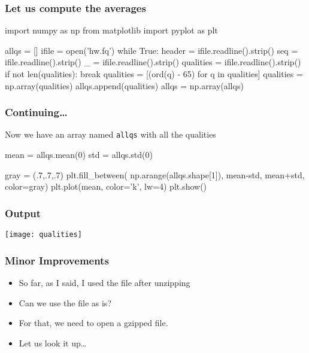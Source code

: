 \begin{frame}[fragile]
\frametitle{Let us compute the averages}

\begin{python}
import numpy as np
from matplotlib import pyplot as plt

allqs = []
ifile = open('hw.fq')
while True:
    header = ifile.readline().strip()
    seq = ifile.readline().strip()
    _ = ifile.readline().strip()
    qualities = ifile.readline().strip()
    if not len(qualities):
        break
    qualities = [(ord(q) - 65) for q in qualities]
    qualities = np.array(qualities)
    allqs.append(qualities)
allqs = np.array(allqs)
\end{python}
\end{frame}

\begin{frame}[fragile]
\frametitle{Continuing\ldots}

Now we have an array named \lstinline{allqs} with all the qualities

\begin{python}
mean = allqs.mean(0)
std = allqs.std(0)
\end{python}

\pause

\begin{python}
gray = (.7,.7,.7)
plt.fill_between(
    np.arange(allqs.shape[1]),
    mean-std,
    mean+std,
    color=gray)
plt.plot(mean, color='k', lw=4)
plt.show()
\end{python}

\end{frame}


\begin{frame}[fragile]
\frametitle{Output}

\centering
\texttt{[image: qualities]}

\end{frame}

\begin{frame}[fragile]
\frametitle{Minor Improvements}

\begin{itemize}
\item So far, as I said, I used the file after unzipping
\item Can we use the file \alert{as is}?
\item For that, we need to open a gzipped file.
\item Let us look it up\ldots
\end{itemize}

\end{frame}

